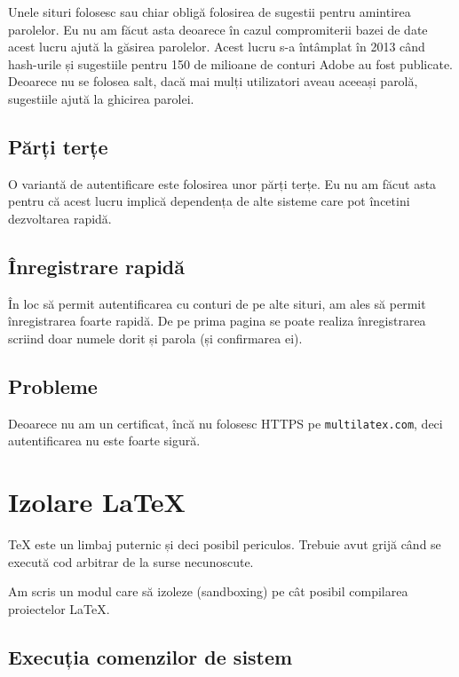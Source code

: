 \documentclass[a4wide,12pt]{report}
\newcommand{\eng}[1]{{#1}} %
\newcommand{\cod}[1]{\texttt{#1}}
\begin{document}
Unele situri folosesc sau chiar obligă folosirea de sugestii pentru amintirea
parolelor. Eu nu am făcut asta deoarece în cazul compromiterii bazei de date
acest lucru ajută la găsirea parolelor. Acest lucru s-a întâmplat în 2013 când
hash-urile și sugestiile pentru 150 de milioane de conturi Adobe au fost
publicate. Deoarece nu se folosea \eng{salt}, dacă mai mulți utilizatori aveau
aceeași parolă, sugestiile ajută la ghicirea parolei.

\subsection{Părți terțe}

O variantă de autentificare este folosirea unor părți terțe. Eu nu am făcut asta
pentru că acest lucru implică dependența de alte sisteme care pot încetini
dezvoltarea rapidă.

\subsection{Înregistrare rapidă}
\label{inregrapsub}

În loc să permit autentificarea cu conturi de pe alte situri, am ales să permit
înregistrarea foarte rapidă. De pe prima pagina se poate realiza înregistrarea
scriind doar numele dorit și parola (și confirmarea ei).

\subsection{Probleme}

Deoarece nu am un certificat, încă nu folosesc HTTPS pe \cod{multilatex.com},
deci autentificarea nu este foarte sigură.

\section{Izolare \LaTeX}

\TeX{} este un limbaj puternic și deci posibil periculos. Trebuie avut grijă când
se execută cod arbitrar de la surse necunoscute.

Am scris un modul care să izoleze (\eng{sandboxing}) pe cât posibil compilarea
proiectelor \LaTeX{}.

\subsection{Execuția comenzilor de sistem}
\end{document}
